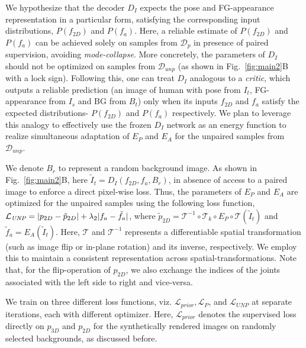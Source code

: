 \documentclass[letterpaper]{article} \usepackage{aaai20}  \usepackage{times}  \usepackage{helvet}  \usepackage{courier}  \usepackage{url}  \usepackage{graphicx}  \usepackage{amsmath}
\begin{document}
We hypothesize that the decoder $D_I$ expects the pose and FG-appearance representation in a particular form, satisfying the corresponding input distributions, $P(f_{2D})$ and $P(f_a)$. Here, a reliable estimate of $P(f_{2D})$ and $P(f_a)$ can be achieved solely on samples from $\mathcal{D}_p$ in presence of paired supervision, avoiding \textit{mode-collapse}. More concretely, the parameters of $D_I$ should not be optimized on samples from $\mathcal{D}_{unp}$ (as shown in Fig.~\ref{fig:main2}B with a lock sign). Following this, one can treat $D_I$ analogous to a \textit{critic}, which outputs a reliable prediction (an image of human with pose from $I_t$, FG-appearance from $I_s$ and BG from $B_t$) only when its inputs $f_{2D}$ and $f_{a}$ satisfy the expected distributions- $P(f_{2D})$ and $P(f_a)$ respectively. We plan to leverage this analogy to effectively use the frozen $D_I$ network as an energy function to realize simultaneous adaptation of $E_P$ and $E_A$ for the unpaired samples from $\mathcal{D}_{unp}$.

We denote $B_r$ to represent a random background image. As shown in Fig.~\ref{fig:main2}B, here $\tilde{I}_t = D_I(f_{2D}, f_{a}, B_r)$, in absence of access to a paired image to enforce a direct pixel-wise loss. Thus, the parameters of $E_P$ and $E_A$ are optimized for the unpaired samples using the following loss function, 
$\mathcal{L}_{\textit{\textit{UNP}}} = |p_{2D} - \tilde{p}_{2D}| + \lambda_2|f_a - \tilde{f}_a|$, where $\tilde{p}_{2D}=\mathcal{T}^{-1} \circ\mathcal{T}_k\circ E_P\circ\mathcal{T}(\tilde{I}_t)$ and $\tilde{f}_a=E_A(\tilde{I}_t)$. Here, $\mathcal{T}$ and $\mathcal{T}^{-1}$ represents a differentiable spatial transformation (such as image flip or in-plane rotation) and its inverse, respectively. We employ this to maintain a consistent representation across spatial-transformations. Note that, for the flip-operation of $p_{2D}$, we also exchange the indices of the joints associated with the left side to right and vice-versa.

We train on three different loss functions, viz. $\mathcal{L}_{prior}, \mathcal{L}_{P}$, and $\mathcal{L}_{\textit{UNP}}$ at separate iterations, each with different optimizer. Here, $\mathcal{L}_{prior}$ denotes the supervised loss directly on $p_{3D}$ and $p_{2D}$ for the synthetically rendered images on randomly selected backgrounds, as discussed before.
\end{document}
